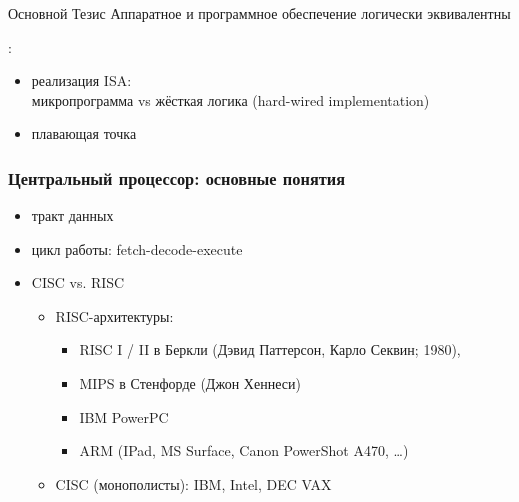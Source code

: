 \begin{frame}
\frametitle{}
\begin{block}{Основной Тезис}
Аппаратное и программное обеспечение логически эквивалентны
\end{block}
:
\begin{itemize}
    \item реализация ISA:\\микропрограмма vs жёсткая логика (hard-wired implementation)
    \item плавающая точка
\end{itemize}
\end{frame}

\begin{frame}
\frametitle{Центральный процессор: основные понятия}
\begin{itemize}
    \item тракт данных
    \item цикл работы: fetch-decode-execute
    \item CISC vs. RISC
\begin{itemize}
    \item RISC-архитектуры:
    \begin{itemize}
        \item RISC I / II в Беркли (Дэвид Паттерсон, Карло Секвин; 1980),
        \item MIPS в Стенфорде (Джон Хеннеси)
        \item IBM PowerPC
        \item ARM (IPad, MS Surface, Canon PowerShot A470, …)
    \end{itemize}
    \item CISC (монополисты): IBM, Intel, DEC VAX
\end{itemize}
\end{itemize}

\end{frame}
